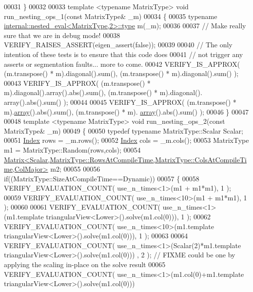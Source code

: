 \begin{DoxyCode}
00031 \}
00032 
00033 \textcolor{keyword}{template} <\textcolor{keyword}{typename} MatrixType> \textcolor{keywordtype}{void} run\_nesting\_ops\_1(\textcolor{keyword}{const} MatrixType& \_m)
00034 \{
00035   \textcolor{keyword}{typename} \hyperlink{class_eigen_1_1internal_1_1_tensor_lazy_evaluator_writable}{internal::nested\_eval<MatrixType,2>::type} m(\_m);
00036 
00037   \textcolor{comment}{// Make really sure that we are in debug mode!}
00038   VERIFY\_RAISES\_ASSERT(eigen\_assert(\textcolor{keyword}{false}));
00039 
00040   \textcolor{comment}{// The only intention of these tests is to ensure that this code does}
00041   \textcolor{comment}{// not trigger any asserts or segmentation faults... more to come.}
00042   VERIFY\_IS\_APPROX( (m.transpose() * m).diagonal().sum(), (m.transpose() * m).diagonal().sum() );
00043   VERIFY\_IS\_APPROX( (m.transpose() * m).diagonal().array().abs().sum(), (m.transpose() * m).diagonal().
      array().abs().sum() );
00044 
00045   VERIFY\_IS\_APPROX( (m.transpose() * m).\hyperlink{class_eigen_1_1array}{array}().abs().sum(), (m.transpose() * m).
      \hyperlink{class_eigen_1_1array}{array}().abs().sum() );
00046 \}
00047 
00048 \textcolor{keyword}{template} <\textcolor{keyword}{typename} MatrixType> \textcolor{keywordtype}{void} run\_nesting\_ops\_2(\textcolor{keyword}{const} MatrixType& \_m)
00049 \{
00050   \textcolor{keyword}{typedef} \textcolor{keyword}{typename} MatrixType::Scalar Scalar;
00051   \hyperlink{namespace_eigen_a62e77e0933482dafde8fe197d9a2cfde}{Index} rows = \_m.rows();
00052   \hyperlink{namespace_eigen_a62e77e0933482dafde8fe197d9a2cfde}{Index} cols = \_m.cols();
00053   MatrixType m1 = MatrixType::Random(rows,cols);
00054   
      \hyperlink{group___core___module_class_eigen_1_1_matrix}{Matrix<Scalar,MatrixType::RowsAtCompileTime,MatrixType::ColsAtCompileTime,ColMajor>}
       m2;
00055 
00056   \textcolor{keywordflow}{if}((MatrixType::SizeAtCompileTime==Dynamic))
00057   \{
00058     VERIFY\_EVALUATION\_COUNT( use\_n\_times<1>(m1 + m1*m1), 1 );
00059     VERIFY\_EVALUATION\_COUNT( use\_n\_times<10>(m1 + m1*m1), 1 );
00060 
00061     VERIFY\_EVALUATION\_COUNT( use\_n\_times<1>(m1.template triangularView<Lower>().solve(m1.col(0))), 1 );
00062     VERIFY\_EVALUATION\_COUNT( use\_n\_times<10>(m1.template triangularView<Lower>().solve(m1.col(0))), 1 );
00063 
00064     VERIFY\_EVALUATION\_COUNT( use\_n\_times<1>(Scalar(2)*m1.template triangularView<Lower>().solve(m1.col(0)))
      , 2 ); \textcolor{comment}{// FIXME could be one by applying the scaling in-place on the solve result}
00065     VERIFY\_EVALUATION\_COUNT( use\_n\_times<1>(m1.col(0)+m1.template triangularView<Lower>().solve(m1.col(0)))

\end{DoxyCode}
